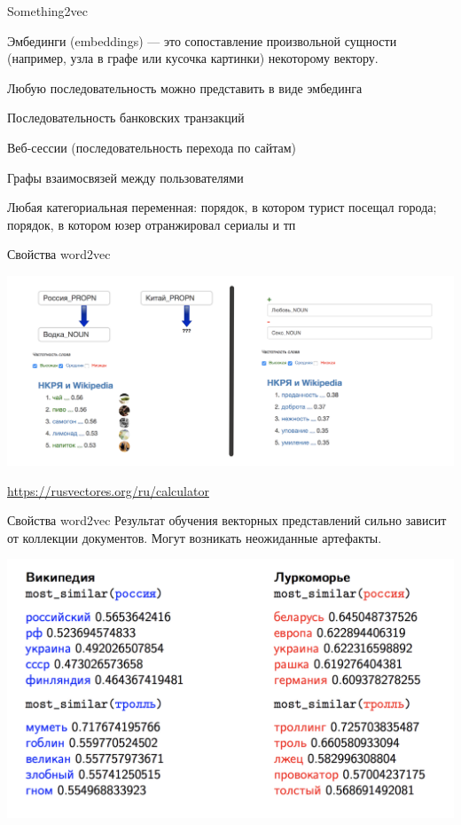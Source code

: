\documentclass[notes,12pt, aspectratio=169]{beamer}
\newenvironment{wideitemize}{\itemize\addtolength{\itemsep}{10pt}}{\enditemize}
\begin{document}
\begin{frame}{Something2vec}
	\begin{wideitemize} 
		\item \alert{Эмбединги (embeddings)} — это сопоставление произвольной сущности (например, узла в графе или кусочка картинки) некоторому вектору.
		
		\item  Любую последовательность можно представить в виде эмбединга
		
		\item  Последовательность банковских транзакций
		
		\item  Веб-сессии (последовательность перехода по сайтам)
		
		\item Графы взаимосвязей между пользователями 
		
		\item Любая категориальная переменная: порядок, в котором турист посещал города; порядок, в котором юзер отранжировал сериалы и тп
	\end{wideitemize} 
\end{frame} 


\begin{frame}{Свойства word2vec}
	\begin{center}
		\includegraphics[width=.85\linewidth]{rusvec_calc2.png}
	\end{center}
	\vfill
	\footnotesize  {\color{blue} \url{https://rusvectores.org/ru/calculator}}
\end{frame} 


\begin{frame}{Свойства word2vec}
	Результат обучения векторных представлений сильно зависит от коллекции документов. \alert{Могут возникать неожиданные артефакты.}
	
	\begin{center}
		\includegraphics[width=.65\linewidth]{wikilurk.png}
	\end{center}
\end{frame} 
\end{document}
